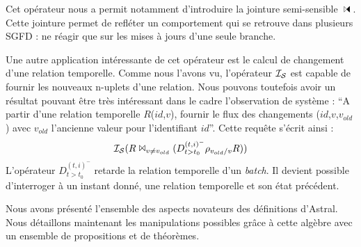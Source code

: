 Cet opérateur nous a permit notamment d'introduire la jointure semi-sensible $\ssjoin$. Cette jointure permet de refléter un comportement qui se retrouve dans plusieurs SGFD : ne réagir que sur les mises à jours d'une seule branche.

Une autre application intéressante de cet opérateur est le calcul de changement d'une relation temporelle. Comme nous l'avons vu, l'opérateur $\mathcal{I_S}$ est capable de fournir les nouveaux n-uplets d'une relation. Nous pouvons toutefois avoir un résultat pouvant être très intéressant dans le cadre l'observation de système : \enquote{A partir d'une relation temporelle $R$($id$,$v$), fournir le flux des changements ($id$,$v$,$v_{old}$) avec $v_{old}$ l'ancienne valeur pour l'identifiant $id$}. Cette requête s'écrit ainsi :
$$\mathcal{I_S}(R \Join_{v\neq v_{old}} (D^{(t,i)^-}_{t>t_0}\rho_{v_{old}/v} R))$$
L'opérateur $D^{(t,i)^-}_{t>t_0}$ retarde la relation temporelle d'un \textit{batch}. Il devient possible d'interroger à un instant donné, une relation temporelle et son état précédent.

Nous avons présenté l'ensemble des aspects novateurs des définitions d'Astral. Nous détaillons maintenant les manipulations possibles grâce à cette algèbre avec un ensemble de propositions et de théorèmes.